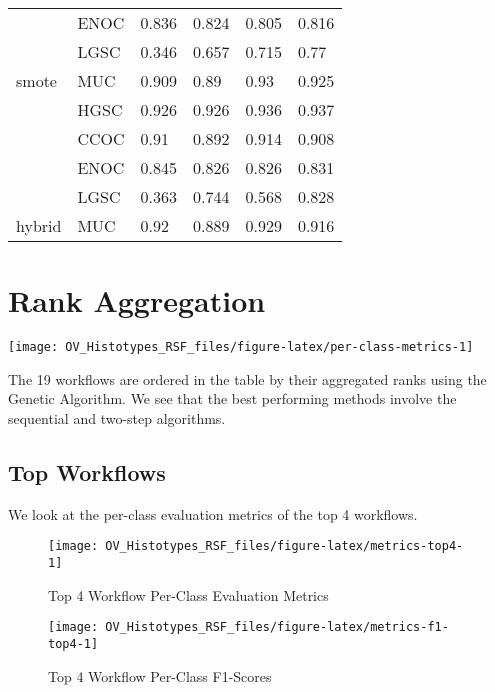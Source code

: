 \documentclass[
]{report}
\begin{document}
\begin{table}
\begin{tabular}[t]{l|l|l|l|l|l}
\cline{2-6}
 & ENOC & 0.836 & 0.824 & 0.805 & 0.816\\
\cline{2-6}
 & LGSC & 0.346 & 0.657 & 0.715 & 0.77\\
\cline{2-6}
\multirow{-5}{*}{\raggedright\arraybackslash smote} & MUC & 0.909 & 0.89 & 0.93 & 0.925\\
\cline{1-6}
 & HGSC & 0.926 & 0.926 & 0.936 & 0.937\\
\cline{2-6}
 & CCOC & 0.91 & 0.892 & 0.914 & 0.908\\
\cline{2-6}
 & ENOC & 0.845 & 0.826 & 0.826 & 0.831\\
\cline{2-6}
 & LGSC & 0.363 & 0.744 & 0.568 & 0.828\\
\cline{2-6}
\multirow{-5}{*}{\raggedright\arraybackslash hybrid} & MUC & 0.92 & 0.889 & 0.929 & 0.916\\
\hline
\end{tabular}
\end{table}

\section{Rank Aggregation}\label{rank-aggregation}

\begin{center}\texttt{[image: OV\_Histotypes\_RSF\_files/figure-latex/per-class-metrics-1]} \end{center}

The 19 workflows are ordered in the table by their aggregated ranks using the Genetic Algorithm. We see that the best performing methods involve the sequential and two-step algorithms.

\subsection{Top Workflows}\label{top-workflows}

We look at the per-class evaluation metrics of the top 4 workflows.

\begin{figure}[H]

{\centering \texttt{[image: OV\_Histotypes\_RSF\_files/figure-latex/metrics-top4-1]} 

}

\caption{Top 4 Workflow Per-Class Evaluation Metrics}\label{fig:metrics-top4}
\end{figure}

\begin{figure}[H]

{\centering \texttt{[image: OV\_Histotypes\_RSF\_files/figure-latex/metrics-f1-top4-1]} 

}

\caption{Top 4 Workflow Per-Class F1-Scores}\label{fig:metrics-f1-top4}
\end{figure}
\end{document}
